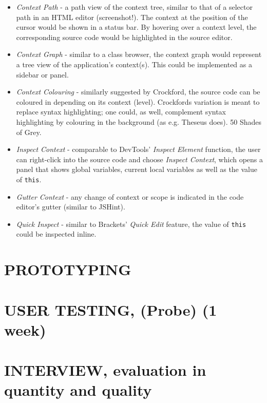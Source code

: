 \begin{itemize}
\itemsep1pt\parskip0pt
\item
  \emph{Context Path} - a path view of the context tree, similar to that
  of a selector path in an HTML editor (screenshot!). The context at the
  position of the cursor would be shown in a status bar. By hovering
  over a context level, the corresponding source code would be
  highlighted in the source editor.
\item
  \emph{Context Graph} - similar to a class browser, the context graph
  would represent a tree view of the application’s context(s). This
  could be implemented as a sidebar or panel.
\item
  \emph{Context Colouring} - similarly suggested by Crockford, the
  source code can be coloured in depending on its context (level).
  Crockfords variation is meant to replace syntax highlighting; one
  could, as well, complement syntax highlighting by colouring in the
  background (as e.g. Theseus does). 50 Shades of Grey.
\item
  \emph{Inspect Context} - comparable to DevTools’ \emph{Inspect
  Element} function, the user can right-click into the source code and
  choose \emph{Inspect Context}, which opens a panel that shows global
  variables, current local variables as well as the value of
  \texttt{this}.
\item
  \emph{Gutter Context} - any change of context or scope is indicated in
  the code editor’s gutter (similar to JSHint).
\item
  \emph{Quick Inspect} - similar to Brackets’ \emph{Quick Edit} feature,
  the value of \texttt{this} could be inspected inline.
\end{itemize}

\section{PROTOTYPING}\label{prototyping}

\section{USER TESTING, (Probe) (1
week)}\label{user-testing-probe-1-week}

\section{INTERVIEW, evaluation in quantity and
quality}\label{interview-evaluation-in-quantity-and-quality}
